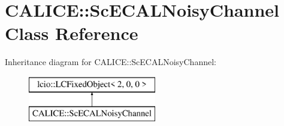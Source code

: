 \section{C\-A\-L\-I\-C\-E\-:\-:Sc\-E\-C\-A\-L\-Noisy\-Channel Class Reference}
\label{classCALICE_1_1ScECALNoisyChannel}
Inheritance diagram for C\-A\-L\-I\-C\-E\-:\-:Sc\-E\-C\-A\-L\-Noisy\-Channel\-:\begin{figure}[H]
\begin{center}
\leavevmode
\includegraphics[height=2.000000cm]{classCALICE_1_1ScECALNoisyChannel}
\end{center}
\end{figure}
